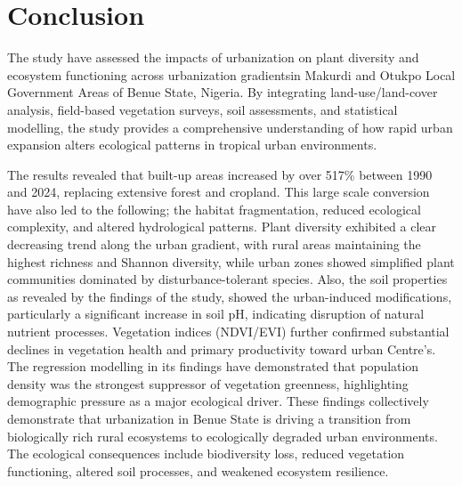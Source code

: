 \chapter*{Conclusion}
\label{ch:conclusion}

{}

The study have assessed the impacts of urbanization on plant diversity and ecosystem functioning across urbanization gradientsin Makurdi and Otukpo Local Government Areas of Benue State, Nigeria. By integrating land-use/land-cover analysis, field-based vegetation surveys, soil assessments, and statistical modelling, the study provides a comprehensive understanding of how rapid urban expansion alters ecological patterns in tropical urban environments.

The results revealed that built-up areas increased by over 517\% between 1990 and 2024, replacing extensive forest and cropland. This large scale conversion have also led to the following; the habitat fragmentation, reduced ecological complexity, and altered hydrological patterns. Plant diversity exhibited a clear decreasing trend along the urban gradient, with rural areas maintaining the highest richness and Shannon diversity, while urban zones showed simplified plant communities dominated by disturbance-tolerant species. Also, the soil properties as revealed by the findings of the study, showed the urban-induced modifications, particularly a significant increase in soil pH, indicating disruption of natural nutrient processes. Vegetation indices (NDVI/EVI) further confirmed substantial declines in vegetation health and primary productivity toward urban Centre's. The regression modelling in its findings have demonstrated that population density was the strongest suppressor of vegetation greenness, highlighting demographic pressure as a major ecological driver. These findings collectively demonstrate that urbanization in Benue State is driving a transition from biologically rich rural ecosystems to ecologically degraded urban environments. The ecological consequences include biodiversity loss, reduced vegetation functioning, altered soil processes, and weakened ecosystem resilience.

